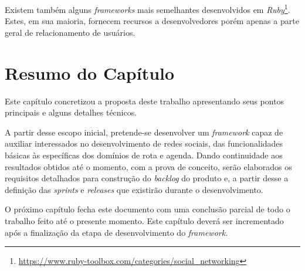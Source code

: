 Existem também alguns \textit{frameworks} mais semelhantes desenvolvidos em \textit{Ruby}\footnote{\url{https://www.ruby-toolbox.com/categories/social_networking}}. Estes, em sua maioria, fornecem recursos a desenvolvedores porém apenas a parte geral de relacionamento de usuários.

\section{Resumo do Capítulo}

Este capítulo concretizou a proposta deste trabalho apresentando seus pontos principais e alguns detalhes técnicos.

A partir desse escopo inicial, pretende-se desenvolver um \textit{framework}  capaz de auxiliar interessados no desenvolvimento de redes sociais, das funcionalidades básicas às específicas dos domínios de rota e agenda. Dando continuidade aos resultados obtidos até o momento, com a prova de conceito, serão elaborados os requisitos detalhados para construção do \textit{backlog} do produto e, a partir desse a definição das \textit{sprints} e \textit{releases} que existirão durante o desenvolvimento.

O próximo capítulo fecha este documento com uma conclusão parcial de todo o trabalho feito até o presente momento. Este capítulo deverá ser incrementado após a finalização da etapa de desenvolvimento do \textit{framework}.
